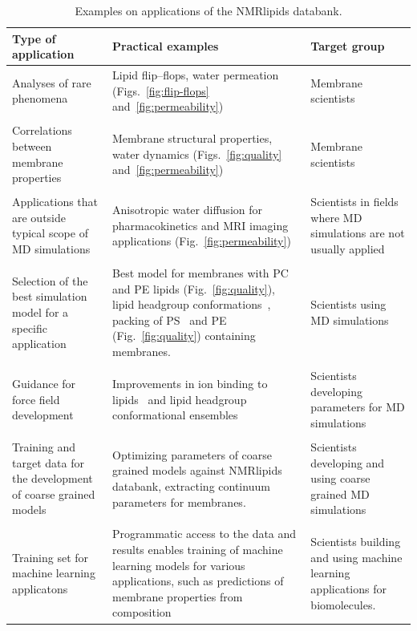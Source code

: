 \documentclass[fleqn,10pt]{wlscirep}
\begin{document}
\begin{table}[t]
    \centering
    \begin{tabular}{p{5.0cm}  p{5.0cm}  p{4.0cm}}
    Type of application     & Practical examples & Target group \\
    \hline
    Analyses of rare phenomena               & Lipid flip--flops, water permeation (Figs.~\ref{fig:flip-flops} and~\ref{fig:permeability}) & Membrane scientists \\
    \\
    Correlations between membrane properties & 
    Membrane structural properties, water dynamics (Figs.~\ref{fig:quality} and~\ref{fig:permeability}) & 
    Membrane scientists \\
    \\
    Applications that are outside typical scope of MD simulations & 
    Anisotropic water diffusion for pharmacokinetics and MRI imaging applications (Fig.~\ref{fig:permeability}) & 
    Scientists in fields where MD simulations are not usually applied \\
    \\
    Selection of the best simulation model for a specific application & 
    Best model for membranes with PC and PE lipids (Fig.~\ref{fig:quality}), lipid headgroup conformations~\cite{bacle21}, 
    packing of PS~\cite{antila22b} and PE (Fig.~\ref{fig:quality}) containing membranes. &
    Scientists using MD simulations \\
    \\
    Guidance for force field development & 
    Improvements in ion binding to lipids~\cite{melcr18,melcr20} and lipid headgroup conformational ensembles~\cite{yu21,dickson22,grote20} &
    Scientists developing parameters for MD simulations \\
    \\
    Training and target data for the development of coarse grained models & 
    Optimizing parameters of coarse grained models against NMRlipids databank, extracting continuum parameters for membranes. &
    Scientists developing and using coarse grained MD simulations \\
    \\
    Training set for machine learning applicatons &
    Programmatic access to the data and results enables training of machine learning models for various applications, such as predictions of membrane properties from composition & Scientists building and using machine learning applications for biomolecules.  
    \end{tabular}
    \caption{Examples on applications of the NMRlipids databank.}
    \label{tab:applications}
\end{table}
\end{document}
